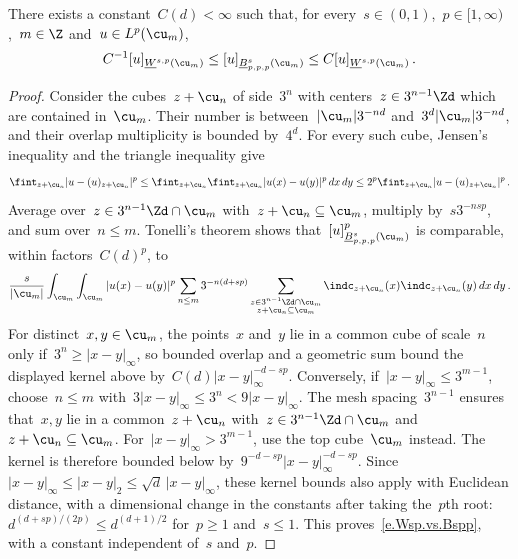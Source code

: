 \documentclass[11pt]{amsart}
\begin{document}
\begin{lemma}
\label{l.Wsp.vs.Bspp}
There exists a constant~$C(d)<\infty$ such that, for every~$s\in (0,1)$,~$p\in [1,\infty)$,~$m \in \Z$ and~$u \in L^p(\cu_m)$,
\begin{equation}
	C^{-1} [  u ]_{\underline{W}^{s,p}(\cu_m)}
	\leq
	[  u ]_{\underline{B}^s_{p,p,p}(\cu_m)}
	\leq
	C [  u ]_{\underline{W}^{s,p}(\cu_m)}
	\,.
	\label{e.Wsp.vs.Bspp}
\end{equation}

\end{lemma}
\begin{proof}
Consider the cubes~$z+\cu_n$ of side~$3^n$ with centers~$z\in3^{n-1}\Zd$ which are contained in~$\cu_m$. Their number is between~$|\cu_m|3^{-nd}$ and~$3^d|\cu_m|3^{-nd}$, and their overlap multiplicity is bounded by~$4^d$. For every such cube, Jensen's inequality and the triangle inequality give
\begin{equation*}
	\fint_{z+\cu_n}|u-(u)_{z+\cu_n}|^p
	\leq\fint_{z+\cu_n}\fint_{z+\cu_n}|u(x)-u(y)|^p\,dx\,dy
	\leq2^p\fint_{z+\cu_n}|u-(u)_{z+\cu_n}|^p\,.
\end{equation*}
Average over~$z\in3^{n-1}\Zd\cap\cu_m$ with~$z+\cu_n\subseteq\cu_m$, multiply by~$s3^{-nsp}$, and sum over~$n\leq m$. Tonelli's theorem shows that~$[u]_{\underline B^s_{p,p,p}(\cu_m)}^p$ is comparable, within factors~$C(d)^p$, to
\begin{equation*}
	\frac{s}{|\cu_m|}\int_{\cu_m}\int_{\cu_m} |u(x)-u(y)|^p
	\sum_{n\leq m}3^{-n(d+sp)}
	\sum_{\substack{z\in3^{n-1}\Zd\cap\cu_m\\z+\cu_n\subseteq\cu_m}}\indc_{z+\cu_n}(x)\indc_{z+\cu_n}(y)\,dx\,dy\,.
\end{equation*}
For distinct~$x,y\in\cu_m$, the points~$x$ and~$y$ lie in a common cube of scale~$n$ only if~$3^n\geq|x-y|_\infty$, so bounded overlap and a geometric sum bound the displayed kernel above by~$C(d)|x-y|_\infty^{-d-sp}$. Conversely, if~$|x-y|_\infty\leq3^{m-1}$, choose~$n\leq m$ with~$3|x-y|_\infty\leq3^n<9|x-y|_\infty$. The mesh spacing~$3^{n-1}$ ensures that~$x,y$ lie in a common~$z+\cu_n$ with~$z\in3^{n-1}\Zd\cap\cu_m$ and~$z+\cu_n\subseteq\cu_m$. For~$|x-y|_\infty>3^{m-1}$, use the top cube~$\cu_m$ instead. The kernel is therefore bounded below by~$9^{-d-sp}|x-y|_\infty^{-d-sp}$. Since~$|x-y|_\infty\leq|x-y|_2\leq\sqrt d\,|x-y|_\infty$, these kernel bounds also apply with Euclidean distance, with a dimensional change in the constants after taking the~$p$th root:~$d^{(d+sp)/(2p)}\leq d^{(d+1)/2}$ for~$p\geq1$ and~$s\leq1$. This proves~\eqref{e.Wsp.vs.Bspp}, with a constant independent of~$s$ and~$p$.
\end{proof}

\begingroup\footnotesize   \endgroup
\end{document}
